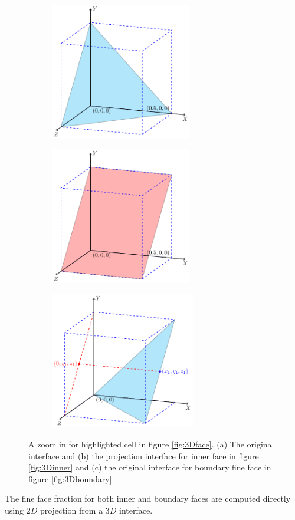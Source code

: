 \documentclass[a4paper]{article}
\begin{document}
\begin{figure}[hp]
    \centering
    \begin{subfigure}[b]{0.45\textwidth}
        \centering
        \includegraphics[height=6cm]{image/fs_3D1.pdf}
        \subcaption{}
        \label{fig:3Dinner1}
    \end{subfigure}
    \begin{subfigure}[b]{0.45\textwidth}
        \centering
        \includegraphics[height=6cm]{image/fs_3D2.pdf}
        \subcaption{}
        \label{fig:3Dinner2}
    \end{subfigure}

    \begin{subfigure}[b]{0.45\textwidth}
        \centering
        \includegraphics[height=6cm]{image/fs_3D5.pdf}
        \subcaption{}
        \label{fig:3Dinner3}
    \end{subfigure}
    \caption{A zoom in for highlighted cell in figure \ref{fig:3Dface}. (a) The original interface and (b) the projection interface for inner face in figure \ref{fig:3Dinner} and (c) the original interface for boundary fine face in figure \ref{fig:3Dboundary}.}
\end{figure}
The fine face fraction for both inner and boundary faces are computed directly using $2D$ projection from a $3D$ interface.\par
\end{document}

